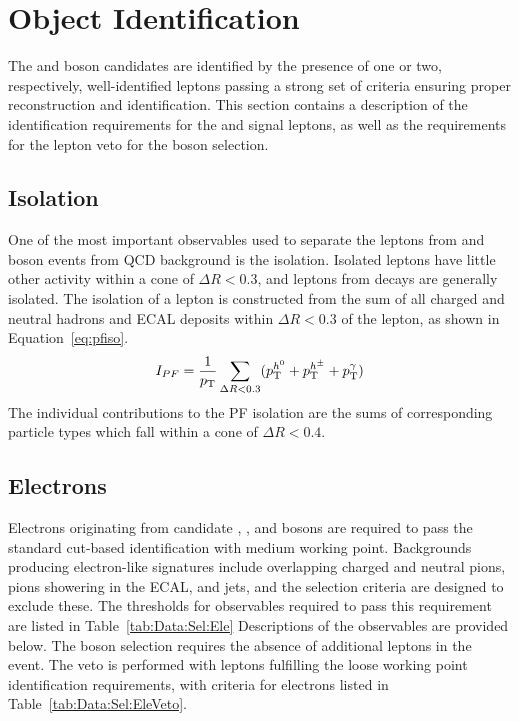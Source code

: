 \section{Object Identification}\label{ch:IdIso}
The \W and \Z boson candidates are identified by the presence of one or two, respectively, well-identified leptons passing a strong set of criteria ensuring proper reconstruction and identification. This section contains a description of the identification requirements for the \wlnu and \zll signal leptons, as well as the requirements for the lepton veto for the \Wpm boson selection.

\subsection{Isolation}\label{ch:id:iso}
One of the most important observables used to separate the leptons from \Wp and \Wm boson events from QCD background is the isolation. Isolated leptons have little other activity within a cone of $\Delta R < 0.3$, and leptons from \wlnu decays are generally isolated. The isolation of a lepton is constructed from the sum of all charged and neutral hadrons and ECAL deposits within $\Delta R < 0.3$ of the lepton, as shown in Equation~\ref{eq:pfiso}. 
\begin{equation}
    I_{PF} = \frac{1}{p_{\mathrm{T}}}\sum_{\Delta R<0.3}( p_{\mathrm{T}}^{h^0} + p_{\mathrm{T}}^{h^\pm} +  p_{\mathrm{T}}^{\gamma})
    \label{eq:pfiso}
\end{equation}
The individual contributions to the PF isolation are the sums of corresponding particle types which fall within a cone of $\Delta R < 0.4$.

\subsection{Electrons}\label{ch:IdIso:Ele}

Electrons originating from candidate \Wp, \Wm, and \Z bosons are required to pass the standard cut-based identification with medium working point. Backgrounds producing electron-like signatures include overlapping charged and neutral pions, pions showering in the ECAL, and jets, and the selection criteria are designed to exclude these. The thresholds for observables required to pass this requirement are listed in Table~\ref{tab:Data:Sel:Ele} Descriptions of the observables are provided below. The \Wpm boson selection requires the absence of additional leptons in the event. The veto is performed with leptons fulfilling the loose working point identification requirements, with criteria for electrons listed in Table~\ref{tab:Data:Sel:EleVeto}. 
